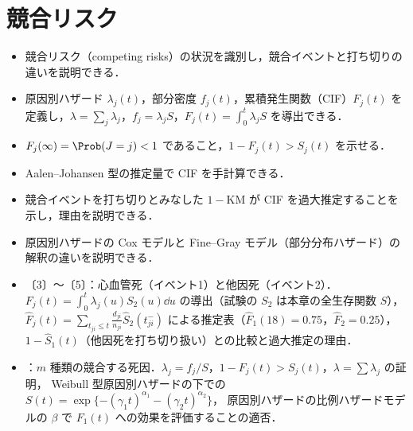 \chapter{競合リスク}\label{ch:11}

\begin{goalbox}
\begin{itemize}
\item 競合リスク（competing risks）の状況を識別し，競合イベントと打ち切りの違いを説明できる．
\item 原因別ハザード $\lambda_j(t)$，部分密度 $f_j(t)$，累積発生関数（CIF）$F_j(t)$ を定義し，$\lambda=\sum_j\lambda_j$，$f_j=\lambda_jS$，$F_j(t)=\int_0^t\lambda_jS$ を導出できる．
\item $F_j(\infty)=\Prob(J=j)<1$ であること，$1-F_j(t)>S_j(t)$ を示せる．
\item Aalen--Johansen 型の推定量で CIF を手計算できる．
\item 競合イベントを打ち切りとみなした $1-\mathrm{KM}$ が CIF を過大推定することを示し，理由を説明できる．
\item 原因別ハザードの Cox モデルと Fine--Gray モデル（部分分布ハザード）の解釈の違いを説明できる．
\end{itemize}
\end{goalbox}

\begin{exambox}
\begin{itemize}
\item {}〔3〕〜〔5〕：心血管死（イベント1）と他因死（イベント2）．$F_j(t)=\int_0^t\lambda_j(u)S_2(u)\dd u$ の導出（試験の $S_2$ は本章の全生存関数 $S$），
      $\hat F_j(t)=\sum_{t_{ji}\le t}\frac{d_{ji}}{n_{ji}}\hat S_2(t_{ji}^-)$ による推定表（$\hat F_1(18)=0.75$，$\hat F_2=0.25$），
      $1-\hat S_1(t)$（他因死を打ち切り扱い）との比較と過大推定の理由．
\item {}：$m$ 種類の競合する死因．$\lambda_j=f_j/S$，$1-F_j(t)>S_j(t)$，$\lambda=\sum\lambda_j$ の証明，
      Weibull 型原因別ハザードの下での $S(t)=\exp\{-(\gamma_1t)^{\alpha_1}-(\gamma_2t)^{\alpha_2}\}$，
      原因別ハザードの比例ハザードモデルの $\beta$ で $F_1(t)$ への効果を評価することの適否．
\end{itemize}
\end{exambox}


